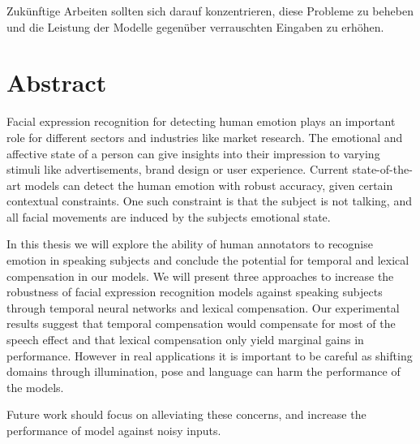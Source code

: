 \documentclass[11pt,a4paper,twoside]{article}
\begin{document}
Zukünftige Arbeiten sollten sich darauf konzentrieren, diese Probleme zu beheben und die Leistung der Modelle gegenüber verrauschten Eingaben zu erhöhen.



\section*{Abstract}

Facial expression recognition for detecting human emotion plays an important role for different sectors and industries like market research. The emotional and affective state of a person can give insights into their impression to varying stimuli like advertisements, brand design or user experience. Current state-of-the-art models can detect the human emotion with robust accuracy, given certain contextual constraints. One such constraint is that the subject is not talking, and all facial movements are induced by the subjects emotional state.

In this thesis we will explore the ability of human annotators to recognise emotion in speaking subjects and conclude the potential for temporal and lexical compensation in our models. We will present three approaches to increase the robustness of facial expression recognition models against speaking subjects through temporal neural networks and lexical compensation. Our experimental results suggest that temporal compensation would compensate for most of the speech effect and that lexical compensation only yield marginal gains in performance. However in real applications it is important to be careful as shifting domains through illumination, pose and language can harm the performance of the models.

Future work should focus on alleviating these concerns, and increase the performance of model against noisy inputs.
\end{document}
